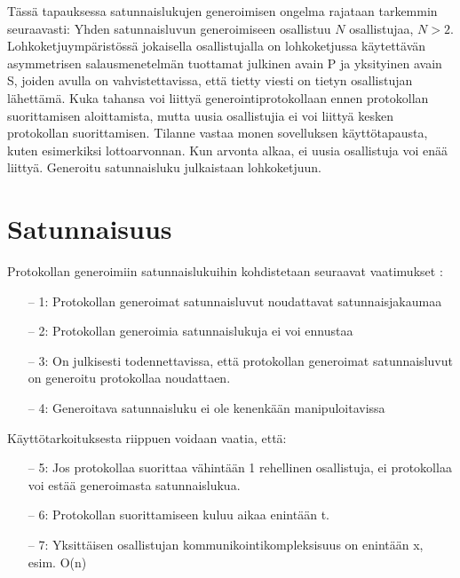 Tässä tapauksessa satunnaislukujen generoimisen ongelma rajataan tarkemmin seuraavasti:
Yhden satunnaisluvun generoimiseen osallistuu $N$ osallistujaa,  $N > 2$. Lohkoketjuympäristössä jokaisella osallistujalla on lohkoketjussa käytettävän asymmetrisen salausmenetelmän tuottamat julkinen avain P ja yksityinen avain S, joiden avulla on vahvistettavissa, että tietty viesti on tietyn osallistujan lähettämä. Kuka tahansa voi liittyä generointiprotokollaan ennen protokollan suorittamisen aloittamista, mutta uusia osallistujia ei voi liittyä kesken protokollan suorittamisen. Tilanne vastaa monen sovelluksen käyttötapausta, kuten esimerkiksi lottoarvonnan. Kun arvonta alkaa, ei uusia osallistuja voi enää liittyä. Generoitu satunnaisluku julkaistaan lohkoketjuun. 

\section{Satunnaisuus}

Protokollan generoimiin satunnaislukuihin kohdistetaan seuraavat vaatimukset \cite{simic_review_2020}:
\begin{itemize}
    \item[--] 1: Protokollan generoimat satunnaisluvut noudattavat satunnaisjakaumaa
    \item[--] 2: Protokollan generoimia satunnaislukuja ei voi ennustaa
    \item[--] 3: On julkisesti todennettavissa, että protokollan generoimat satunnaisluvut on generoitu protokollaa noudattaen.
    \item[--] 4: Generoitava satunnaisluku ei ole kenenkään manipuloitavissa
\end{itemize}\textbf{}
Käyttötarkoituksesta riippuen voidaan vaatia, että:

\begin{itemize}
    \item[--] 5: Jos protokollaa suorittaa vähintään 1 rehellinen osallistuja, ei protokollaa voi estää generoimasta satunnaislukua.
    \item[--] 6: Protokollan suorittamiseen kuluu aikaa enintään t.
    \item[--] 7: Yksittäisen osallistujan kommunikointikompleksisuus on enintään x, esim. O(n)
\end{itemize}